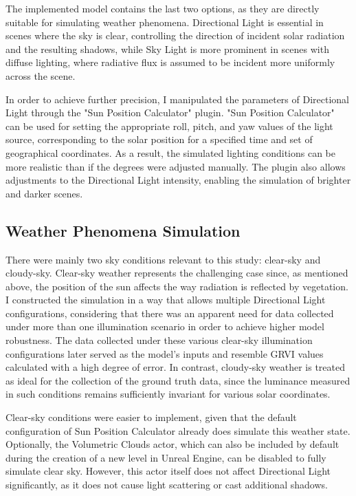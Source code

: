The implemented model contains the last two options, as they are directly suitable for simulating weather phenomena. Directional Light is essential in scenes where the sky is clear, controlling the direction of incident solar radiation and the resulting shadows, while Sky Light is more prominent in scenes with diffuse lighting, where radiative flux is assumed to be incident more uniformly across the scene.

In order to achieve further precision, I manipulated the parameters of Directional Light through the "Sun Position Calculator" plugin. "Sun Position Calculator" can be used for setting the appropriate roll, pitch, and yaw values of the light source, corresponding to the solar position for a specified time and set of geographical coordinates. As a result, the simulated lighting conditions can be more realistic than if the degrees were adjusted manually. The plugin also allows adjustments to the Directional Light intensity, enabling the simulation of brighter and darker scenes.


\subsection{Weather Phenomena Simulation}

There were mainly two sky conditions relevant to this study: clear-sky and cloudy-sky. Clear-sky weather represents the challenging case since, as mentioned above, the position of the sun affects the way radiation is reflected by vegetation. I constructed the simulation in a way that allows multiple Directional Light configurations, considering that there was an apparent need for data collected under more than one illumination scenario in order to achieve higher model robustness. The data collected under these various clear-sky illumination configurations later served as the model's inputs and resemble GRVI values calculated with a high degree of error. In contrast, cloudy-sky weather is treated as ideal for the collection of the ground truth data, since the luminance measured in such conditions remains sufficiently invariant for various solar coordinates.

Clear-sky conditions were easier to implement, given that the default configuration of Sun Position Calculator already does simulate this weather state. Optionally, the Volumetric Clouds actor, which can also be included by default during the creation of a new level in Unreal Engine, can be disabled to fully simulate clear sky. However, this actor itself does not affect Directional Light significantly, as it does not cause light scattering or cast additional shadows.

